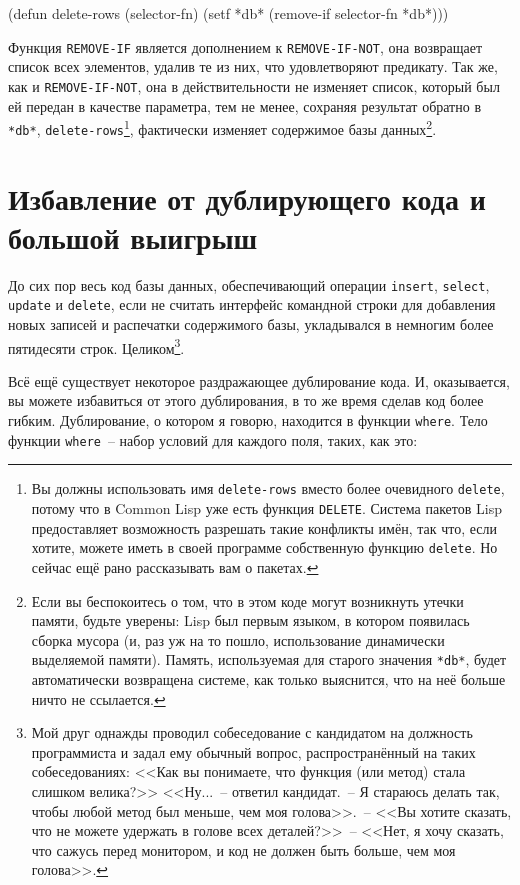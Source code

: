 \begin{myverb}
(defun delete-rows (selector-fn)
  (setf *db* (remove-if selector-fn *db*)))
\end{myverb}

Функция \lstinline{REMOVE-IF} является дополнением к \lstinline{REMOVE-IF-NOT}, она возвращает
список всех элементов, удалив те из них, что удовлетворяют предикату. Так же, как и
\lstinline{REMOVE-IF-NOT}, она в действительности не изменяет список, который был ей передан
в качестве параметра, тем не менее, сохраняя результат обратно в \lstinline{*db*},
\lstinline{delete-rows}\footnote{Вы должны использовать имя \lstinline{delete-rows} вместо более
  очевидного \lstinline{delete}, потому что в Common Lisp уже есть функция
  \lstinline{DELETE}. Система пакетов Lisp предоставляет возможность разрешать такие
  конфликты имён, так что, если хотите, можете иметь в своей программе собственную функцию
  \lstinline{delete}. Но сейчас ещё рано рассказывать вам о пакетах.}, фактически изменяет
содержимое базы данных\footnote{Если вы беспокоитесь о том, что в этом коде могут
  возникнуть утечки памяти, будьте уверены: Lisp был первым языком, в котором появилась
  сборка мусора (и, раз уж на то пошло, использование динамически выделяемой
  памяти). Память, используемая для старого значения \lstinline{*db*}, будет автоматически возвращена
  системе, как только выяснится, что на неё больше ничто не ссылается.}.

\section{Избавление от дублирующего кода и большой выигрыш}

До сих пор весь код базы данных, обеспечивающий операции \lstinline{insert}, \lstinline{select},
\lstinline{update} и \lstinline{delete}, если не считать интерфейс командной строки для добавления
новых записей и распечатки содержимого базы, укладывался в немногим более пятидесяти
строк. Целиком\footnote{Мой друг однажды проводил собеседование с кандидатом на должность
  программиста и задал ему обычный вопрос, распространённый на таких собеседованиях: <<Как
  вы понимаете, что функция (или метод) стала слишком велика?>> <<Ну...~-- ответил
  кандидат.~-- Я стараюсь делать так, чтобы любой метод был меньше, чем моя голова>>.~--  <<Вы
  хотите сказать, что не можете удержать в голове всех деталей?>>~-- <<Нет, я хочу сказать,
  что сажусь перед монитором, и код не должен быть больше, чем моя голова>>.}.

Всё ещё существует некоторое раздражающее дублирование кода. И, оказывается, вы можете
избавиться от этого дублирования, в то же время сделав код более гибким. Дублирование, о
котором я говорю, находится в функции \lstinline{where}. Тело функции \lstinline{where}~-- набор
условий для каждого поля, таких, как это:

